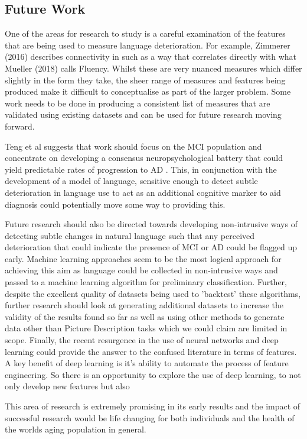 \documentclass[10pt, letterpaper, twoside, openany]{book}
\begin{document}
\subsection{Future Work}
One of the areas for research to study is a careful examination of the features that are being used to measure language deterioration. For example, Zimmerer (2016) \cite{Zimmerer2016} describes connectivity in such as a way that correlates directly with what Mueller (2018) \cite{Mueller2018a} calls Fluency. Whilst these are very nuanced measures which differ slightly in the form they take, the sheer range of measures and features being produced make it difficult to conceptualise as part of the larger problem. Some work needs to be done in producing a consistent list of measures that are validated using existing datasets and can be used for future research moving forward. \newline
\par
Teng et al suggests that work should focus on the MCI population and concentrate on developing a consensus neuropsychological battery that could yield predictable rates of progression to AD \cite{Teng2009}. This, in conjunction with the development of a model of language, sensitive enough to detect subtle deterioration in language use to act as an additional cognitive marker to aid diagnosis could potentially move some way to providing this.
\par 
Future research should also be directed towards developing non-intrusive ways of detecting subtle changes in natural language such that any perceived deterioration that could indicate the presence of MCI or AD could be flagged up early. Machine learning approaches seem to be the most logical approach for achieving this aim as language could be collected in non-intrusive ways and passed to a machine learning algorithm for preliminary classification.  Further, despite the excellent quality of datasets being used to 'backtest' these algorithms, further research should look at generating additional datasets to increase the validity of the results found so far as well as using other methods to generate data other than Picture Description tasks which we could claim are limited in scope. Finally, the recent resurgence in the use of neural networks and deep learning could provide the answer to the confused literature in terms of features. A key benefit of deep learning is it's ability to automate the process of feature engineering. So there is an opportunity to explore the use of deep learning, to not only develop new features but also  
\par
This area of research is extremely promising in its early results and the impact of successful research would be life changing for both individuals and the health of the worlds aging population in general.
\end{document}
